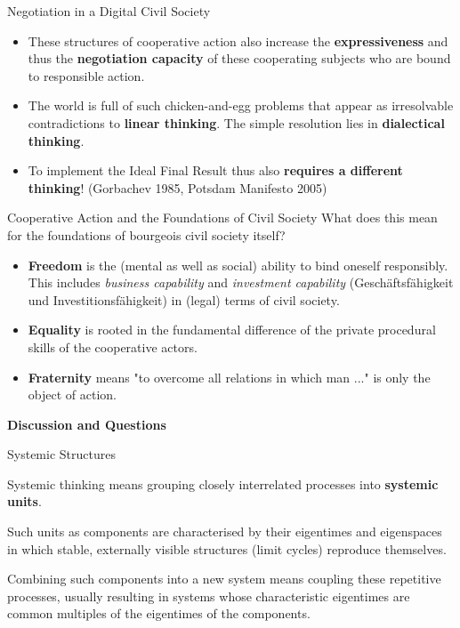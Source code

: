 \documentclass{beamer}
\begin{document}
\begin{frame}{Negotiation in a Digital Civil Society}
\begin{itemize}
\item These structures of cooperative action also increase the
  \textbf{expressiveness} and thus the \textbf{negotiation capacity} of these
  cooperating subjects who are bound to responsible action.
\item The world is full of such chicken-and-egg problems that appear as
  irresolvable contradictions to \textbf{linear thinking}. The simple
  resolution lies in \textbf{dialectical thinking}.
\item To implement the Ideal Final Result thus also \textbf{requires a
  different thinking}! (Gorbachev 1985, Potsdam Manifesto 2005)
\end{itemize}
\end{frame}

\begin{frame}{Cooperative Action and the Foundations of Civil Society}
  What does this mean for the foundations of bourgeois civil society itself?
  \begin{itemize}
  \item \textbf{Freedom} is the (mental as well as social) ability to bind
    oneself responsibly. This includes \emph{business capability} and
    \emph{investment capability} (Geschäftsfähigkeit und
    Investitionsfähigkeit) in (legal) terms of civil society.
  \item \textbf{Equality} is rooted in the fundamental difference of the
    private procedural skills of the cooperative actors.
  \item \textbf{Fraternity} means "to overcome all relations in which man
    ..." is only the object of action.
  \end{itemize}
\end{frame}

\begin{frame}{}\centering\LARGE\bf
  Discussion and Questions
\end{frame}

\begin{frame}{Systemic Structures}

Systemic thinking means grouping closely interrelated processes into
\textbf{systemic units}.

Such units as components are characterised by their eigentimes and eigenspaces
in which stable, externally visible structures (limit cycles) reproduce
themselves.

Combining such components into a new system means coupling these repetitive
processes, usually resulting in systems whose characteristic eigentimes are
common multiples of the eigentimes of the components.

\end{frame}
\end{document}
